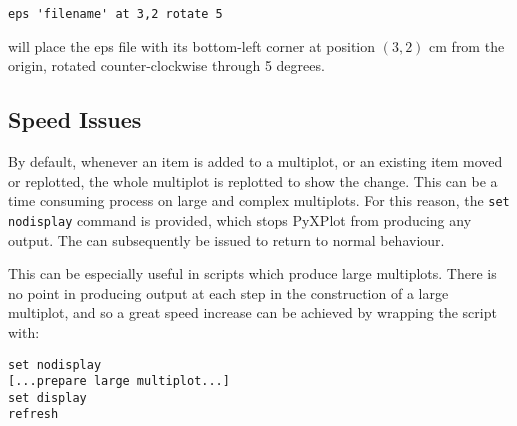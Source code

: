 \begin{verbatim}
eps 'filename' at 3,2 rotate 5
\end{verbatim}

\noindent will place the eps file with its bottom-left corner at position
$(3,2)$ cm from the origin, rotated counter-clockwise through 5 degrees.

\subsection{Speed Issues}
\label{set_display}

By default, whenever an item is added to a multiplot, or an existing item moved
or replotted, the whole multiplot is replotted to show the change. This can be
a time consuming process on large and complex multiplots. For this reason, the
{\tt set nodisplay} command is provided, which stops PyXPlot from producing any
output. The  can subsequently be issued to return to
normal behaviour.

This can be especially useful in scripts which produce large multiplots. There
is no point in producing output at each step in the construction of a large
multiplot, and so a great speed increase can be achieved by wrapping the script
with:

\begin{verbatim} 
set nodisplay
[...prepare large multiplot...]
set display
refresh
\end{verbatim}

